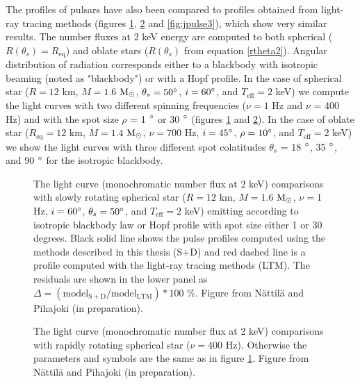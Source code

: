 \documentclass{wihuri}
\def\msun{{\rm M_{\odot}}}
\def\thetas{\theta_{s}}
\begin{document}
The profiles of pulsars have also been compared to profiles obtained from light-ray tracing methods (figures \ref{fig:jpulse1}, \ref{fig:jpulse2} and \ref{fig:jpulse3}), which show very similar results. %
The number fluxes at 2 keV energy are computed to both spherical ($R(\thetas) = R_{\mathrm{eq}}$) and oblate stars ($R(\thetas)$ from equation \ref{rtheta2}). Angular distribution of radiation corresponds either to a blackbody with isotropic beaming (noted as "blackbody") or with a Hopf profile. %
In the case of spherical star ($R = 12$ km, $M = 1.6$ $\msun$, $\thetas = 50 \degree$, $i = 60 \degree$, and $T_{\mathrm{eff}} = 2$ keV) we compute the light curves with two different spinning frequencies ($\nu = 1$ Hz and $\nu$ = 400 Hz) and with the spot size $\rho$ = 1 $\degree$ or 30 $\degree$ (figures \ref{fig:jpulse1} and \ref{fig:jpulse2}). In the case of oblate star ($R_{\mathrm{eq}} = 12$ km, $M = 1.4$ $\msun$, $\nu = 700$ Hz, $i = 45 \degree$, $\rho = 10 \degree$, and $T_{\mathrm{eff}} = 2$ keV) we show the light curves with three different spot colatitudes $\thetas$  = 18 $\degree$, 35 $\degree$, and 90 $\degree$ for the isotropic blackbody.





\begin{figure}
\centerline{}
\caption{The light curve (monochromatic number flux at 2 keV) comparisons with slowly rotating spherical star ($R = 12$ km, $M = 1.6$ $\msun$, $\nu = 1$ Hz, $i = 60 \degree$, $\thetas = 50 \degree$, and $T_{\mathrm{eff}} = 2$ keV) emitting according to isotropic blackbody law or Hopf profile with spot size either 1 or 30 degrees. Black solid line shows the pulse profiles computed using the methods described in this thesis (S+D) and red dashed line is a profile computed with the light-ray tracing methods (LTM). The residuals are shown in the lower panel as $\Delta = (\mathrm{model}_{\mathrm{S+D}}/\mathrm{model}_{\mathrm{LTM}})*100$ \%. Figure from Nättilä and Pihajoki (in preparation).
\label{fig:jpulse1}}
\end{figure}


\begin{figure}
\centerline{}
\caption{The light curve (monochromatic number flux at 2 keV) comparisons with rapidly rotating spherical star ($\nu = 400$ Hz). Otherwise the parameters and symbols are the same as in figure \ref{fig:jpulse1}. Figure from Nättilä and Pihajoki (in preparation).
\label{fig:jpulse2}}
\end{figure}
\end{document}
